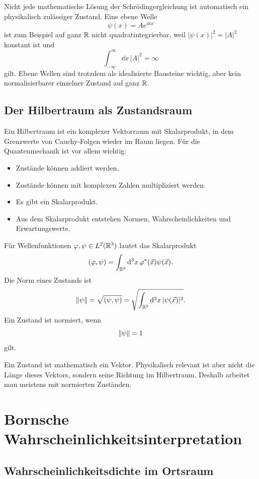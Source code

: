 \begin{notebox}
Nicht jede mathematische Lösung der Schrödingergleichung ist automatisch ein physikalisch zulässiger Zustand. Eine ebene Welle
\[
    \psi(x)=Ae^{ikx}
\]
ist zum Beispiel auf ganz $\mathbb{R}$ nicht quadratintegrierbar, weil $|\psi(x)|^2=|A|^2$ konstant ist und
\[
    \int_{-\infty}^{\infty}\dd x\,|A|^2=\infty
\]
gilt. Ebene Wellen sind trotzdem als idealisierte Bausteine wichtig, aber kein normalisierbarer einzelner Zustand auf ganz $\mathbb{R}$.
\end{notebox}

\subsection{Der Hilbertraum als Zustandsraum}

Ein Hilbertraum ist ein komplexer Vektorraum mit Skalarprodukt, in dem Grenzwerte von Cauchy-Folgen wieder im Raum liegen. Für die Quantenmechanik ist vor allem wichtig:
\begin{itemize}
    \item Zustände können addiert werden.
    \item Zustände können mit komplexen Zahlen multipliziert werden.
    \item Es gibt ein Skalarprodukt.
    \item Aus dem Skalarprodukt entstehen Normen, Wahrscheinlichkeiten und Erwartungswerte.
\end{itemize}

Für Wellenfunktionen $\varphi,\psi\in L^2(\mathbb{R}^3)$ lautet das Skalarprodukt
\[
    (\varphi,\psi)
    =\int_{\mathbb{R}^3}\mathrm{d}^3x\,\varphi^*(\vec{x})\psi(\vec{x}).
\]
Die Norm eines Zustands ist
\[
    \left\lVert \psi \right\rVert=\sqrt{(\psi,\psi)}
    =\sqrt{\int_{\mathbb{R}^3}\mathrm{d}^3x\,|\psi(\vec{x})|^2}.
\]
Ein Zustand ist normiert, wenn
\[
    \left\lVert \psi \right\rVert=1
\]
gilt.

\begin{conceptbox}
Ein Zustand ist mathematisch ein Vektor. Physikalisch relevant ist aber nicht die Länge dieses Vektors, sondern seine Richtung im Hilbertraum. Deshalb arbeitet man meistens mit normierten Zuständen.
\end{conceptbox}

\section{Bornsche Wahrscheinlichkeitsinterpretation}

\subsection{Wahrscheinlichkeitsdichte im Ortsraum}

